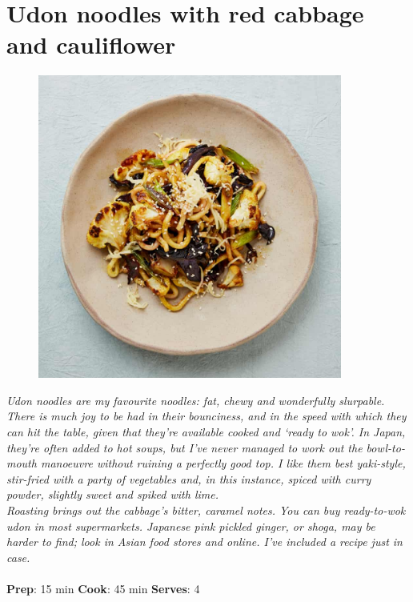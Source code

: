 \documentclass{book}
\begin{document}
\section{Udon noodles with red cabbage and cauliflower}
\begin{figure}
\centering\includegraphics[width=10cm,height=10cm,keepaspectratio]{Recipe_Pictures/Udon_noodles_with_red_cabbage_and_cauliflower.png}
\end{figure}
\emph{Udon noodles are my favourite noodles: fat, chewy and wonderfully slurpable. There is much joy to be had in their bounciness, and in the speed with which they can hit the table, given that they’re available cooked and ‘ready to wok’. In Japan, they’re often added to hot soups, but I’ve never managed to work out the bowl-to-mouth manoeuvre without ruining a perfectly good top. I like them best yaki-style, stir-fried with a party of vegetables and, in this instance, spiced with curry powder, slightly sweet and spiked with lime.\\ 
Roasting brings out the cabbage’s bitter, caramel notes. You can buy ready-to-wok udon in most supermarkets. Japanese pink pickled ginger, or shoga, may be harder to find; look in Asian food stores and online. I’ve included a recipe just in case.}\\\\ 
\textbf{Prep}: 15 min
\textbf{Cook}: 45 min
\textbf{Serves}: 4
\end{document}
